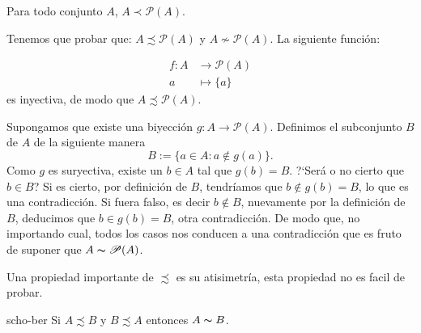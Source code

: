 \begin{teorema}[Cantor]{}\label{teorcantor} Para todo conjunto $A$, $A\prec\mathscr{P}(A)$.
\end{teorema}
\begin{demo} Tenemos que probar que: $A\precsim\mathscr{P}(A)$ y
$A\nsim\mathscr{P}(A)$. La siguiente función:

\[\begin{split}
        f:A&\longrightarrow\mathscr{P}(A)\\
          a&\longmapsto \{a\}
  \end{split}
\]
es inyectiva, de modo que $A\precsim\mathscr{P}(A)$.



Supongamos que existe una biyección
$g:A\longrightarrow\mathscr{P}(A)$. 
Definimos el subconjunto $B$
de $A$ de la siguiente manera
\[B:=\{a\in A:a\notin g(a)\}.\]
Como $g$ es suryectiva, existe un $b\in A$ tal que $g(b)=B$.
?`Será o no cierto que $b\in B$? Si es cierto, por definición
de $B$, tendríamos que $b\notin g(b)=B$, lo que es una
contradicción. Si fuera falso, es decir $b\notin B$, nuevamente
por la definición de $B$, deducimos que $b\in g(b)=B$, otra
contradicción. De modo que, no importando cual, todos los casos
nos conducen a una contradicción que es  fruto de suponer que
$A\thicksim\mathscr{P}(A)$.
\end{demo}

Una propiedad importante de $\precsim$ es su atisimetría,
esta propiedad no es facil de probar.

\begin{teorema}{scho-ber} Si
$A\precsim B$ y $B\precsim A$ entonces $A\thicksim B$.
\end{teorema}

